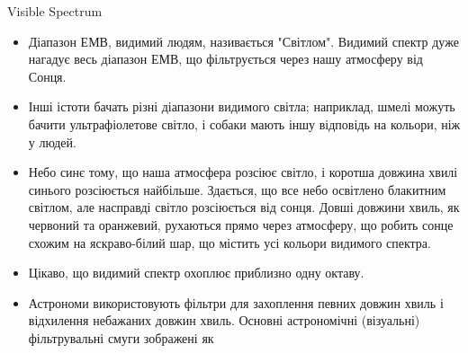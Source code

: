 {
{\Large Visible Spectrum \hspace{0.05in}
}
\begin{itemize}

\item Діапазон ЕМВ, видимий людям, називається "Світлом". Видимий спектр дуже нагадує весь діапазон ЕМВ, що фільтрується через нашу атмосферу від Сонця.

\item Інші істоти бачать різні діапазони видимого світла; наприклад, шмелі можуть бачити ультрафіолетове світло, і собаки мають іншу відповідь на кольори, ніж у людей.

\item Небо синє тому, що наша атмосфера розсіює світло, і коротша довжина хвилі синього розсіюється найбільше. Здається, що все небо освітлено блакитним світлом, але насправді світло розсіюється від сонця. Довші довжини хвиль, як червоний та оранжевий, рухаються прямо через атмосферу, що робить сонце схожим на яскраво-білий шар, що містить усі кольори видимого спектра.

\item Цікаво, що видимий спектр охоплює приблизно одну октаву.

\item Астрономи використовують фільтри для захоплення певних довжин хвиль і відхилення небажаних довжин хвиль. Основні астрономічні (візуальні) фільтрувальні смуги зображені як 

\end{itemize}
}
